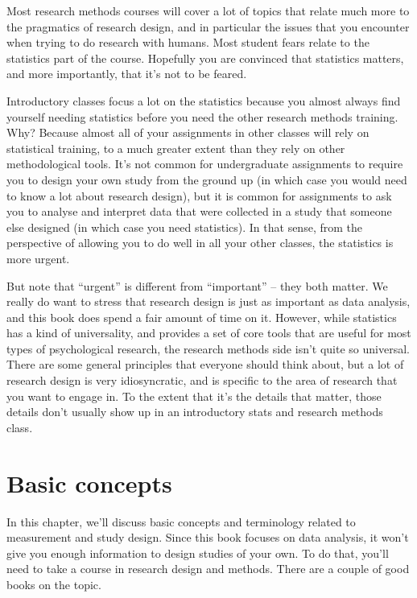 \documentclass[
  11pt,
  a4paper,
  twoside,symmetric,openright]{book}
\theoremstyle{break}
\theoremstyle{break}
\begin{document}
Most research methods courses will cover a lot of topics that relate much more to the pragmatics of research design, and in particular the issues that you encounter when trying to do research with humans. Most student fears relate to the statistics part of the course. Hopefully you are convinced that statistics matters, and more importantly, that it's not to be feared.

Introductory classes focus a lot on the statistics because you almost always find yourself needing statistics before you need the other research methods training. Why? Because almost all of your assignments in other classes will rely on statistical training, to a much greater extent than they rely on other methodological tools. It's not common for undergraduate assignments to require you to design your own study from the ground up (in which case you would need to know a lot about research design), but it is common for assignments to ask you to analyse and interpret data that were collected in a study that someone else designed (in which case you need statistics). In that sense, from the perspective of allowing you to do well in all your other classes, the statistics is more urgent.

But note that ``urgent'' is different from ``important'' -- they both matter. We really do want to stress that research design is just as important as data analysis, and this book does spend a fair amount of time on it. However, while statistics has a kind of universality, and provides a set of core tools that are useful for most types of psychological research, the research methods side isn't quite so universal. There are some general principles that everyone should think about, but a lot of research design is very idiosyncratic, and is specific to the area of research that you want to engage in. To the extent that it's the details that matter, those details don't usually show up in an introductory stats and research methods class.

\chapter{Basic concepts}\label{researchdesign}

In this chapter, we'll discuss basic concepts and terminology related to measurement and study design. Since this book focuses on data analysis, it won't give you enough information to design studies of your own. To do that, you'll need to take a course in research design and methods. There are a couple of good books on the topic.
\end{document}
